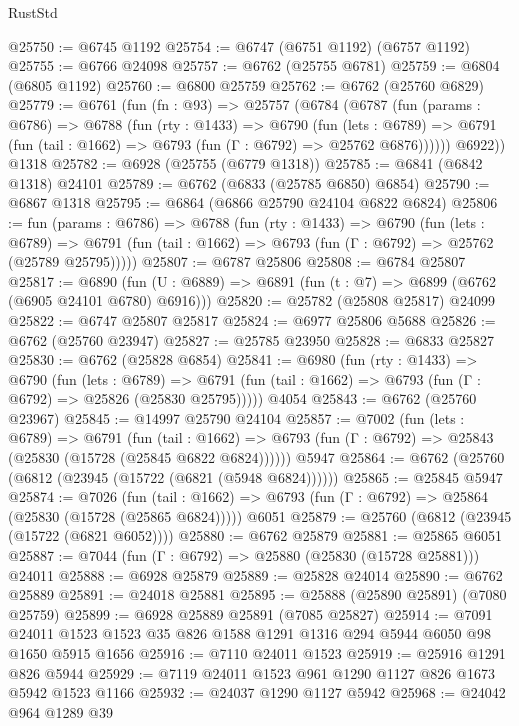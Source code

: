 \begin{lexlean}{RustStd}
\begin{coremodule}
@25750 := @6745 @1192
@25754 := @6747 (@6751 @1192) (@6757 @1192)
@25755 := @6766 @24098
@25757 := @6762 (@25755 @6781)
@25759 := @6804 (@6805 @1192)
@25760 := @6800 @25759
@25762 := @6762 (@25760 @6829)
@25779 := @6761
    (fun (fn : @93) =>
    @25757
      (@6784
        (@6787
          (fun (params : @6786) =>
          @6788
            (fun (rty : @1433) =>
            @6790
              (fun (lets : @6789) =>
              @6791 (fun (tail : @1662) => @6793 (fun (Γ : @6792) => @25762 @6876))))))
        @6922))
    @1318
@25782 := @6928 (@25755 (@6779 @1318))
@25785 := @6841 (@6842 @1318) @24101
@25789 := @6762 (@6833 (@25785 @6850) @6854)
@25790 := @6867 @1318
@25795 := @6864 (@6866 @25790 @24104 @6822 @6824)
@25806 := fun (params : @6786) =>
  @6788
    (fun (rty : @1433) =>
    @6790
      (fun (lets : @6789) =>
      @6791 (fun (tail : @1662) => @6793 (fun (Γ : @6792) => @25762 (@25789 @25795)))))
@25807 := @6787 @25806
@25808 := @6784 @25807
@25817 := @6890
    (fun (U : @6889) => @6891 (fun (t : @7) => @6899 (@6762 (@6905 @24101 @6780) @6916)))
@25820 := @25782 (@25808 @25817) @24099
@25822 := @6747 @25807 @25817
@25824 := @6977 @25806 @5688
@25826 := @6762 (@25760 @23947)
@25827 := @25785 @23950
@25828 := @6833 @25827
@25830 := @6762 (@25828 @6854)
@25841 := @6980
    (fun (rty : @1433) =>
    @6790
      (fun (lets : @6789) =>
      @6791 (fun (tail : @1662) => @6793 (fun (Γ : @6792) => @25826 (@25830 @25795)))))
    @4054
@25843 := @6762 (@25760 @23967)
@25845 := @14997 @25790 @24104
@25857 := @7002
    (fun (lets : @6789) =>
    @6791
      (fun (tail : @1662) =>
      @6793 (fun (Γ : @6792) => @25843 (@25830 (@15728 (@25845 @6822 @6824))))))
    @5947
@25864 := @6762 (@25760 (@6812 (@23945 (@15722 (@6821 (@5948 @6824))))))
@25865 := @25845 @5947
@25874 := @7026
    (fun (tail : @1662) => @6793 (fun (Γ : @6792) => @25864 (@25830 (@15728 (@25865 @6824)))))
    @6051
@25879 := @25760 (@6812 (@23945 (@15722 (@6821 @6052))))
@25880 := @6762 @25879
@25881 := @25865 @6051
@25887 := @7044 (fun (Γ : @6792) => @25880 (@25830 (@15728 @25881))) @24011
@25888 := @6928 @25879
@25889 := @25828 @24014
@25890 := @6762 @25889
@25891 := @24018 @25881
@25895 := @25888 (@25890 @25891) (@7080 @25759)
@25899 := @6928 @25889 @25891 (@7085 @25827)
@25914 := @7091 @24011 @1523 @1523 @35 @826 @1588 @1291 @1316 @294 @5944 @6050 @98 @1650 @5915 @1656
@25916 := @7110 @24011 @1523
@25919 := @25916 @1291 @826 @5944
@25929 := @7119 @24011 @1523 @961 @1290 @1127 @826 @1673 @5942 @1523 @1166
@25932 := @24037 @1290 @1127 @5942
@25968 := @24042
    @964
    @1289
    @39

\end{coremodule}
\end{lexlean}
